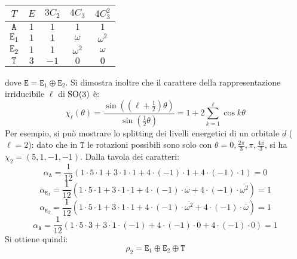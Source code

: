 \begin{table}[H]
	\centering
	\begin{tabular}{c|cccc}
		$ T $ & $ E $ & $ 3C_2 $ & $ 4C_3 $ & $ 4C_3^2 $ \\
		\hline
		$ \mathtt{A} $ & $ 1 $ & $ 1 $ & $ 1 $ & $ 1 $ \\
		$ \mathtt{E}_1 $ & $ 1 $ & $ 1 $ & $ \omega $ & $ \omega^2 $ \\
		$ \mathtt{E}_2 $ & $ 1 $ & $ 1 $ & $ \omega^2 $ & $ \omega $ \\
		$ \mathtt{T} $ & $ 3 $ & $ -1 $ & $ 0 $ & $ 0 $
	\end{tabular}
\end{table}
dove $ \mathtt{E} = \mathtt{E}_1 \oplus \mathtt{E}_2 $. Si dimostra inoltre che il carattere della rappresentazione irriducibile $ \ell $ di $ \mathrm{SO}(3) $ è:
\begin{equation}
	\chi_{\ell}(\theta) = \frac{\sin \left( \left( \ell + \frac{1}{2} \right) \theta \right)}{\sin \left( \frac{1}{2} \theta \right)} = 1 + 2 \sum_{k = 1}^{\ell} \cos k\theta
	\label{eq:8.37}
\end{equation}
Per esempio, si può mostrare lo splitting dei livelli energetici di un orbitale $ d $ ($ \ell = 2 $): dato che in $ \mathtt{T} $ le rotazioni possibili sono solo con $ \theta = 0, \frac{2\pi}{3}, \pi, \frac{4\pi}{3} $, si ha $ \chi_2 = (5,1,-1,-1) $. Dalla tavola dei caratteri:
\begin{equation*}
	\alpha_{\mathtt{A}} = \frac{1}{12} (1 \cdot 5 \cdot 1 + 3 \cdot 1 \cdot 1 + 4 \cdot (-1) \cdot 1 + 4 \cdot (-1) \cdot 1) = 0
\end{equation*}
\begin{equation*}
	\alpha_{\mathtt{E}_1} = \frac{1}{12} (1 \cdot 5 \cdot 1 + 3 \cdot 1 \cdot 1 + 4 \cdot (-1) \cdot \overline{\omega} + 4 \cdot (-1) \cdot \overline{\omega^2}) = 1
\end{equation*}
\begin{equation*}
	\alpha_{\mathtt{E}_2} = \frac{1}{12} (1 \cdot 5 \cdot 1 + 3 \cdot 1 \cdot 1 + 4 \cdot (-1) \cdot \overline{\omega^2} + 4 \cdot (-1) \cdot \overline{\omega}) = 1
\end{equation*}
\begin{equation*}
	\alpha_{\mathtt{A}} = \frac{1}{12} (1 \cdot 5 \cdot 3 + 3 \cdot 1 \cdot (-1) + 4 \cdot (-1) \cdot 0 + 4 \cdot (-1) \cdot 0) = 1
\end{equation*}
Si ottiene quindi:
\begin{equation*}
	\rho_2 = \mathtt{E}_1 \oplus \mathtt{E}_2 \oplus \mathtt{T}
\end{equation*}

